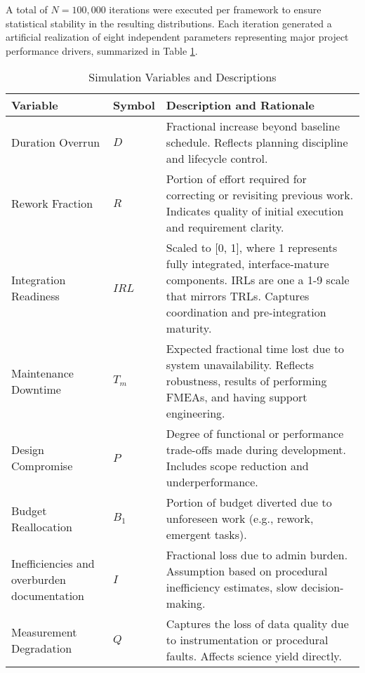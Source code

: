 A total of $N = 100{,}000$ iterations were executed per framework to ensure statistical stability in the resulting distributions. 
Each iteration generated a artificial realization of eight independent parameters representing major project performance drivers, summarized in Table \ref{tab:variables}. 
\begin{table}[htbp]
    \centering
    \caption{Simulation Variables and Descriptions}
    \label{tab:variables}
    \begin{tabular}{llp{8cm}}
        \toprule
        \textbf{Variable} & \textbf{Symbol} & \textbf{Description and Rationale} \\
        \midrule
        Duration Overrun & $D$ & Fractional increase beyond baseline schedule. Reflects planning discipline and lifecycle control. \\
        Rework Fraction & $R$ & Portion of effort required for correcting or revisiting previous work. Indicates quality of initial execution and requirement clarity. \\
        Integration Readiness & $IRL$ & Scaled to [0, 1], where 1 represents fully integrated, interface-mature components. IRLs are one a 1-9 scale that mirrors TRLs.\cite{gao2020tra} Captures coordination and pre-integration maturity. \\
        Maintenance Downtime & $T_m$ & Expected fractional time lost due to system unavailability. Reflects robustness, results of performing FMEAs, and having support engineering. \\
        Design Compromise & $P$ & Degree of functional or performance trade-offs made during development. Includes scope reduction and underperformance. \\
        Budget Reallocation & $B_1$ & Portion of budget diverted due to unforeseen work (e.g., rework, emergent tasks). \\
        Inefficiencies and overburden documentation & $I$ & Fractional loss due to admin burden. Assumption based on procedural inefficiency estimates, slow decision-making.\\
        Measurement Degradation & $Q$ & Captures the loss of data quality due to instrumentation or procedural faults. Affects science yield directly. \\
        \bottomrule
    \end{tabular}
\end{table}


